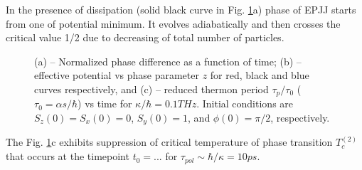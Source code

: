 \documentclass[aps, pre, preprint, groupedaddress, superscriptaddress, showkeys, showpacs] {revtex4-1}
\begin{document}
In the presence of dissipation (solid black curve in Fig. \ref{pic:phase}a) phase of EPJJ starts from one of potential  minimum. It evolves adiabatically and then  crosses the critical value 1/2
due to decreasing of total number of particles. 
%
%
%
\begin{figure}[ht]
\caption{(a) -- Normalized phase difference as a function of time; (b) -- effective potential vs phase parameter $z$ for red, black and blue curves respectively, and (c) -- reduced thermon period $\tau_{p} / \tau_0$ ($\tau_0 = \alpha s / \hbar$) vs time for $\kappa/\hbar = 0.1 THz$. 
Initial conditions are $S_z(0) = S_x(0) = 0$, $S_y(0) = 1$, and $\phi(0) = \pi / 2$, respectively.
\label{pic:phase}}
\end{figure}
%
%

The Fig. \ref{pic:phase}c exhibits suppression of critical temperature of phase transition $T_{c}^{(2)}$ that occurs at the timepoint $t_0=...$ for  $\tau_{pol} \sim \hbar/\kappa= 10 ps$.
 
\end{document}
